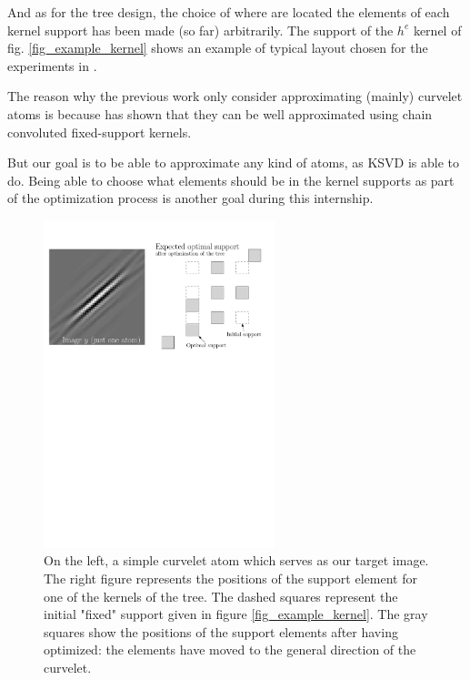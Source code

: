And as for the tree design, the choice of where are located the elements of each kernel support has been made (so far) arbitrarily. The support of the $h^e$ kernel of fig. \ref{fig_example_kernel} shows an example of typical layout chosen for the experiments in \cite{chabiron_optimization_2016}. 

The reason why the previous work only consider approximating (mainly) curvelet atoms is because \cite{chabiron_apprentissage_2015} has shown that they can be well approximated using chain convoluted fixed-support kernels.

But our goal is to be able to approximate any kind of atoms, as \ac{KSVD} is able to do. Being able to choose what elements should be in the kernel supports as part of the optimization process is another goal during this internship.

\begin{figure}[!ht] \centering
\includegraphics[width=0.6\textwidth]{figures/example-optimized-support.pdf}
\caption{On the left, a simple curvelet atom which serves as our target image. The right figure represents the positions of the support element for one of the kernels of the tree. The dashed squares represent the initial "fixed" support given in figure \ref{fig_example_kernel}. The gray squares show the positions of the support elements after having optimized: the elements have moved to the general direction of the curvelet.\label{fig_example_optimal_support}}
\end{figure}

